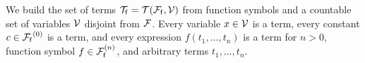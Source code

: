 
\begin{definition}\label{def:terms}
	We build the set of {\myem terms }${\mathcal T}_{\mathsf f} = {{\mathcal T}({\mathcal F}_{\mathsf f},{\mathcal V})}$ 
	from function symbols and a
	countable set of {\myem variables }${\mathcal V}$ disjoint from ${\mathcal F}$\!.
	Every variable $x\in{\mathcal V}$ is a term,
	every {\myem constant} $c\in{{\mathcal F}_{\mathsf f}}^{(0)}$ is a term, 
	and every expression $f(t_1,\ldots,t_n)$ is a term
	for $n>0$, function symbol $f\in{{\mathcal F}^{(n)}_{\mathsf f}}$,  
	and arbitrary terms $t_1,\ldots,t_n$.
\end{definition}


